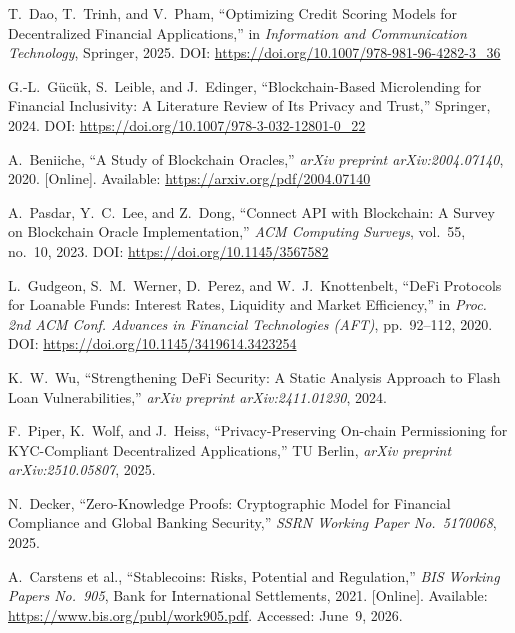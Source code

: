 \documentclass[12pt, a4paper]{report}
\begin{document}
{\begin{enumerate}[label={[\arabic*]}]
\item T.~Dao, T.~Trinh, and V.~Pham, ``Optimizing Credit Scoring Models for Decentralized Financial Applications,'' in \textit{Information and Communication Technology}, Springer, 2025. DOI: \url{https://doi.org/10.1007/978-981-96-4282-3_36}

\item G.-L.~G\"{u}c\"{u}k, S.~Leible, and J.~Edinger, ``Blockchain-Based Microlending for Financial Inclusivity: A Literature Review of Its Privacy and Trust,'' Springer, 2024. DOI: \url{https://doi.org/10.1007/978-3-032-12801-0_22}

\item A.~Beniiche, ``A Study of Blockchain Oracles,'' \textit{arXiv preprint arXiv:2004.07140}, 2020. [Online]. Available: \url{https://arxiv.org/pdf/2004.07140}

\item A.~Pasdar, Y.~C.~Lee, and Z.~Dong, ``Connect API with Blockchain: A Survey on Blockchain Oracle Implementation,'' \textit{ACM Computing Surveys}, vol.~55, no.~10, 2023. DOI: \url{https://doi.org/10.1145/3567582}

\item L.~Gudgeon, S.~M.~Werner, D.~Perez, and W.~J.~Knottenbelt, ``DeFi Protocols for Loanable Funds: Interest Rates, Liquidity and Market Efficiency,'' in \textit{Proc. 2nd ACM Conf. Advances in Financial Technologies (AFT)}, pp.~92--112, 2020. DOI: \url{https://doi.org/10.1145/3419614.3423254}

\item K.~W.~Wu, ``Strengthening DeFi Security: A Static Analysis Approach to Flash Loan Vulnerabilities,'' \textit{arXiv preprint arXiv:2411.01230}, 2024.

\item F.~Piper, K.~Wolf, and J.~Heiss, ``Privacy-Preserving On-chain Permissioning for KYC-Compliant Decentralized Applications,'' TU Berlin, \textit{arXiv preprint arXiv:2510.05807}, 2025.

\item N.~Decker, ``Zero-Knowledge Proofs: Cryptographic Model for Financial Compliance and Global Banking Security,'' \textit{SSRN Working Paper No.~5170068}, 2025.

\item A.~Carstens et al., ``Stablecoins: Risks, Potential and Regulation,'' \textit{BIS Working Papers No.~905}, Bank for International Settlements, 2021. [Online]. Available: \url{https://www.bis.org/publ/work905.pdf}. Accessed: June~9, 2026.


\end{enumerate}}
\end{document}
